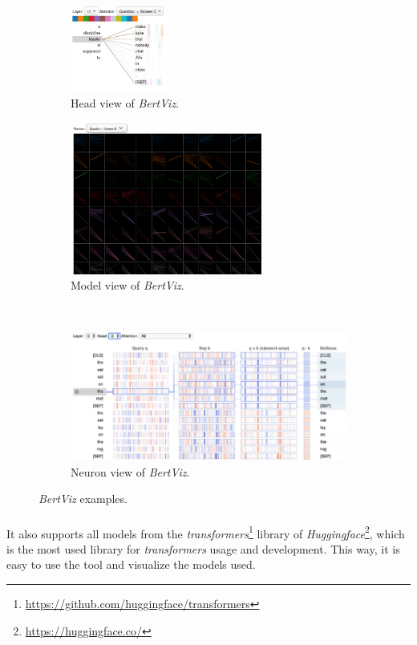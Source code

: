 \begin{figure}[h]
\centering
\begin{subfigure}{0.4\textwidth}
  \centering
	\includegraphics[width=120px]{images/bertviz-question-l11}
	\caption{Head view of \emph{BertViz}.}
	\label{fig:bertviz-head}
\end{subfigure}
\medskip
\begin{subfigure}{0.4\textwidth}
  \centering
	\includegraphics[width=240px]{images/bertviz-model-sample}
	\caption{Model view of \emph{BertViz}.}
	\label{fig:bertviz-model}
\end{subfigure}
\medskip\\
\begin{subfigure}{\textwidth}
	\centering
	\includegraphics[width=420px]{images/neuronview-example}
	\caption{Neuron view of \emph{BertViz}.}
	\label{fig:bertviz-neuron}
\end{subfigure}
\caption{\emph{BertViz} examples.}
\label{fig:bertviz-examples}
\end{figure}
\paragraph{}
It also supports all models from the \emph{transformers}\footnote{\url{https://github.com/huggingface/transformers}} library of \emph{Huggingface}\footnote{\url{https://huggingface.co/}}, which is the most used library for \emph{transformers} usage and development. This way, it is easy to use the tool and visualize the models used.
